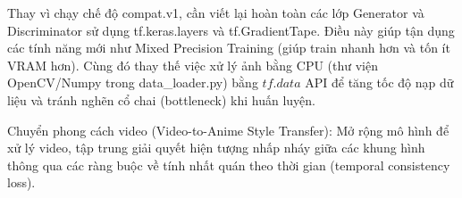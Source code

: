 Thay vì chạy chế độ compat.v1, cần viết lại hoàn toàn các lớp Generator và 
Discriminator sử dụng tf.keras.layers và tf.GradientTape. Điều này giúp tận dụng 
các tính năng mới như Mixed Precision Training (giúp train nhanh hơn và tốn ít 
VRAM hơn). Cùng đó thay thế việc xử lý ảnh bằng CPU (thư viện OpenCV/Numpy trong 
data\_loader.py) bằng $tf.data$ API để tăng tốc độ nạp dữ liệu và tránh nghẽn cổ chai 
(bottleneck) khi huấn luyện.

Chuyển phong cách video (Video-to-Anime Style Transfer): Mở rộng mô hình để xử 
lý video, tập trung giải quyết hiện tượng nhấp nháy giữa các khung hình 
thông qua các ràng buộc về tính nhất quán theo thời gian (temporal consistency loss).
